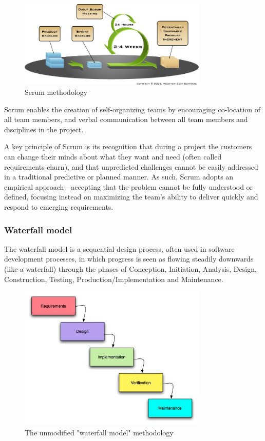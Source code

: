 	\begin{figure}[htb]
		\centering
		\includegraphics[width=0.8\textwidth]{prestudy/development_process/scrum.png}
		\caption{Scrum methodology}
		\label{fig:scrum-methology}
	\end{figure}
	
	Scrum enables the creation of self-organizing teams by encouraging co-location of all team members, and verbal communication between all team members and disciplines in the project.\newline
	
	A key principle of Scrum is its recognition that during a project the customers can change their minds about what they want and need (often called requirements churn), and that unpredicted challenges cannot be easily addressed in a traditional predictive or planned manner. As such, Scrum adopts an empirical approach—accepting that the problem cannot be fully understood or defined, focusing instead on maximizing the team’s ability to deliver quickly and respond to emerging requirements.\newline

	\subsubsection{Waterfall model}
	The waterfall model is a sequential design process, often used in software development processes, in which progress is seen as flowing steadily downwards (like a waterfall) through the phases of Conception, Initiation, Analysis, Design, Construction, Testing, Production/Implementation and Maintenance.\newline
	
	\begin{figure}[htb]
		\centering
		\includegraphics[width=0.8\textwidth]{prestudy/development_process/waterfall.jpg}
		\caption{The unmodified "waterfall model" methodology}
		\label{fig:waterfall-model}
	\end{figure}
	
